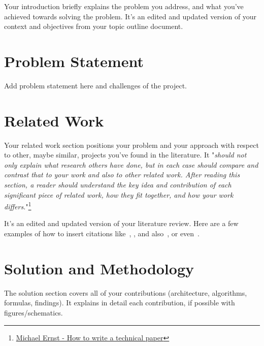 \documentclass{scrartcl}
\begin{document}
Your introduction briefly explains the problem you address, and what you've achieved towards solving the problem. It's an edited and updated version of your context and objectives from your topic outline document.
\section{Problem Statement}

Add problem statement here and challenges of the project. 


\section{Related Work}

Your related work section positions your problem and your approach with respect to other, maybe similar, projects you've found in the literature.
It "\textit{should not only explain what research others have done, but in each case should compare and contrast that to your work and also to other related work. After reading this section, a reader should understand the key idea and contribution of each significant piece of related work, how they fit together, and how your work differs.}"\footnote{\href{https://homes.cs.washington.edu/~mernst/advice/write-technical-paper.html\#related-work}{Michael Ernst - How to write a technical paper}}

It's an edited and updated version of your literature review. Here are a few examples of how to insert citations like~\cite{byzantine-pki}, \cite{atomic-mcast-tcs01}, and also~\cite{sybilattack}, or even~\cite{psn-fail, verisign-fail}.

\section{Solution and Methodology}

The solution section covers all of your contributions (architecture, algorithms, formulas, findings).
It explains in detail each contribution, if possible with figures/schematics.
\end{document}
